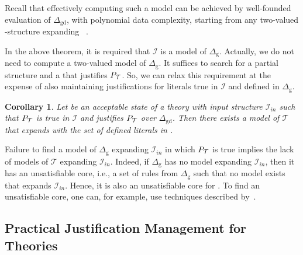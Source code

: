 \documentclass[11pt]{article}
\newcommand{\m}[1]{\ensuremath{#1}\xspace}
\newcommand{\I}{\m{\mathcal{I}}}
\newcommand{\Iin}{\m{\I_{in}}}
\newcommand{\theory}{\m{\mathcal{T}}}
\newcommand{\D}{\m{\Delta}}
\newcommand{\logicname}[1]{\text{\sc #1}\xspace}
\newcommand{\foid}{\logicname{FO(\ensuremath{ID})}}
\theoremstyle{plain}
\newtheorem{corollary}[thm]{Corollary}
\theoremstyle{definition}
\theoremstyle{example_basic}
\theoremstyle{example_contd}
\theoremstyle{plain}
\newcommand{\Dg}{\ensuremath{\D_\text{g}}\xspace}
\newcommand{\Dgd}{\ensuremath{\D_\text{gd}}\xspace}
\newcommand{\pt}{\ensuremath{P_\text{\theory}}\xspace}
\newcommand{\change}[1]{#1}
\begin{document}
Recall that effectively computing such a model \M can be achieved by well-founded evaluation of \Dgd, with polynomial data complexity, starting from any two-valued -structure expanding ~\cite{jacm/ChenW96}.

In the above theorem, it is required that \I is a model of \Dg. Actually, we do not need to compute a two-valued model of \Dg. It suffices to search for a partial structure and a \justification that justifies \pt. So, we can relax this requirement at the expense of also maintaining justifications for literals true in \I and defined in \Dg.

\begin{corollary}\label{col:acceptable}
  Let  be an acceptable state of a theory
   with input structure \Iin such that \pt is
  true in \I and \jgraph justifies \pt over \Dgd.
Then there exists a model \M of \theory that expands  with  the set of defined literals in . 
\end{corollary}

Failure to find a model of \Dg expanding \Iin in which \pt is true implies the lack of models of \theory expanding \Iin. Indeed, if \Dg has no model expanding \Iin, then it has an unsatisfiable core, i.e., a set of rules from \Dg such that no model exists that expands \Iin. Hence, it is also an unsatisfiable core for . To find an unsatisfiable core, one can, for example, use techniques described by~.


\subsection{\change{Practical Justification Management for \foid Theories}}\label{sec:default}

\newcommand{\rf}{\ensuremath{c_r}\xspace}
\newcommand{\crf}{\ensuremath{\cc_{\rf}}\xspace}
\end{document}
